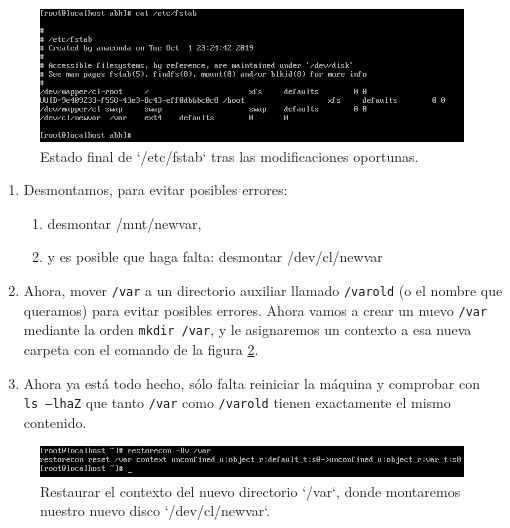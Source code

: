 \documentclass[
]{memoir}
\providecommand{\tightlist}{%
  \setlength{\itemsep}{0pt}\setlength{\parskip}{0pt}}
\begin{document}
\begin{figure}

{\centering \includegraphics[width=0.95\linewidth]{images/k} 

}

\caption{Estado final de `/etc/fstab` tras las modificaciones oportunas.}\label{fig:k}
\end{figure}

\begin{enumerate}
\def\labelenumi{\arabic{enumi}.}
\setcounter{enumi}{12}
\item
  Desmontamos, para evitar posibles errores:

  \begin{enumerate}
  \def\labelenumii{\roman{enumii}.}
  \tightlist
  \item
    desmontar /mnt/newvar,
  \item
    y es posible que haga falta: desmontar /dev/cl/newvar
  \end{enumerate}
\item
  Ahora, mover \texttt{/var} a un directorio auxiliar llamado \texttt{/varold} (o el nombre que queramos) para evitar posibles errores. Ahora vamos a crear un nuevo \texttt{/var} mediante la orden \texttt{mkdir\ /var}, y le asignaremos un contexto a esa nueva carpeta con el comando de la figura \ref{fig:l}.
\item
  Ahora ya está todo hecho, sólo falta reiniciar la máquina y comprobar con \texttt{ls\ –lhaZ} que tanto \texttt{/var} como \texttt{/varold} tienen exactamente el mismo contenido.
\end{enumerate}

\begin{figure}

{\centering \includegraphics[width=0.95\linewidth]{images/l} 

}

\caption{Restaurar el contexto del nuevo directorio `/var`, donde montaremos nuestro nuevo disco `/dev/cl/newvar`.}\label{fig:l}
\end{figure}
\end{document}
